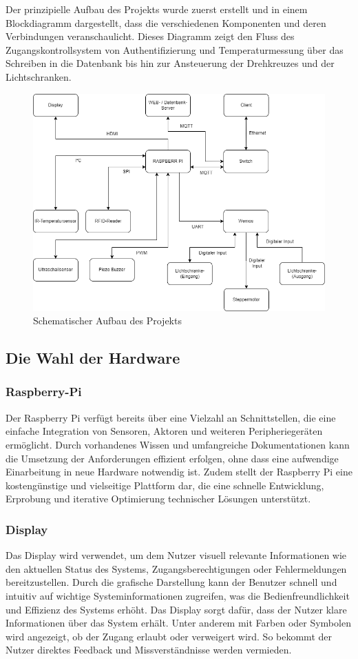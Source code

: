 Der prinzipielle Aufbau des Projekts wurde zuerst erstellt und in einem Blockdiagramm dargestellt, dass die verschiedenen Komponenten und deren Verbindungen veranschaulicht. Dieses Diagramm zeigt den Fluss des Zugangskontrollsystem von Authentifizierung und Temperaturmessung über das Schreiben in die Datenbank bis hin zur Ansteuerung der Drehkreuzes und der Lichtschranken.

\begin{figure}[h]
	\centering
	\includegraphics[width=0.4\linewidth]{figures/Prinzipienschaltbild.png}
	\caption[Prinzipienschaltbild]{Schematischer Aufbau des Projekts}\label{fig:prinzipienschaltbild}
\end{figure}


\subsection{Die Wahl der Hardware}\label{subsec:die_wahl_der_hardware}

\subsubsection{Raspberry-Pi}

Der Raspberry Pi verfügt bereits über eine Vielzahl an Schnittstellen, die eine einfache Integration von Sensoren, Aktoren und weiteren Peripheriegeräten ermöglicht. Durch vorhandenes Wissen und umfangreiche Dokumentationen kann die Umsetzung der Anforderungen effizient erfolgen, ohne dass eine aufwendige Einarbeitung in neue Hardware notwendig ist. Zudem stellt der Raspberry Pi eine kostengünstige und vielseitige Plattform dar, die eine schnelle Entwicklung, Erprobung und iterative Optimierung technischer Lösungen unterstützt.

\subsubsection{Display}

Das Display wird verwendet, um dem Nutzer visuell relevante Informationen wie den aktuellen Status des Systems, Zugangsberechtigungen oder Fehlermeldungen bereitzustellen. Durch die grafische Darstellung kann der Benutzer schnell und intuitiv auf wichtige Systeminformationen zugreifen, was die Bedienfreundlichkeit und Effizienz des Systems erhöht. Das Display sorgt dafür, dass der Nutzer klare Informationen über das System erhält. Unter anderem mit Farben oder Symbolen wird angezeigt, ob der Zugang erlaubt oder verweigert wird. So bekommt der Nutzer direktes Feedback und Missverständnisse werden vermieden.

